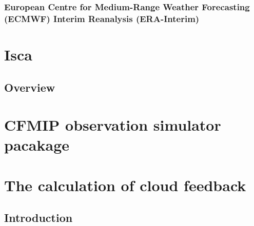 \subsubsection{European Centre for Medium-Range Weather Forecasting (ECMWF) Interim Reanalysis (ERA-Interim)}

\section{Isca}
\label{sec:isca_intro}
\subsection{Overview}


\section{CFMIP observation simulator pacakage}
\label{sec:cosp}

\section{The calculation of cloud feedback}
\label{sec:method_cloud_fbk}

\subsection{Introduction}

